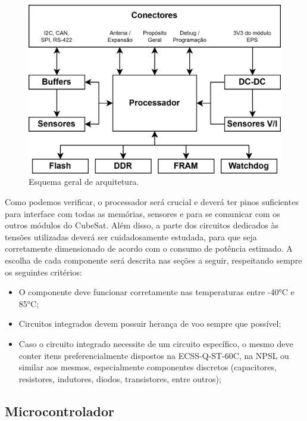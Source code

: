 \begin{figure}[H]
    \centering
    \includegraphics[scale=1.2]{images/arquitetura geral.png}
    \caption{Esquema geral de arquitetura.}
    \label{fig:arq_geral}
\end{figure}

Como podemos verificar, o processador será crucial e deverá ter pinos suficientes para interface com todas as memórias, sensores e para se comunicar com os outros módulos do CubeSat. Além disso, a parte dos circuitos dedicados às tensões utilizadas deverá ser cuidadosamente estudada, para que seja corretamente dimensionado de acordo com o consumo de potência estimado. A escolha de cada componente será descrita nas seções a seguir, respeitando sempre os seguintes critérios:

\begin{itemize}
	\item O componente deve funcionar corretamente nas temperaturas entre -40°C e 85°C;
	\item Circuitos integrados devem possuir herança de voo sempre que possível;
	\item Caso o circuito integrado necessite de um circuito específico, o mesmo deve conter itens preferencialmente dispostos na ECSS-Q-ST-60C, na NPSL ou similar aos mesmos, especialmente componentes discretos (capacitores, resistores, indutores, diodos, transistores, entre outros);
\end{itemize}

\subsection{Microcontrolador}

